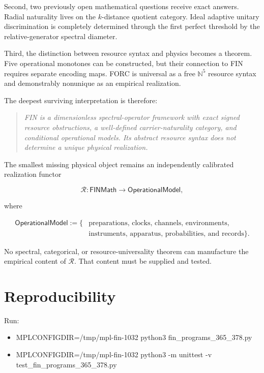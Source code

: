 \documentclass[11pt,a4paper,openany]{report}
\begin{document}
Second, two previously open mathematical questions receive exact answers. Radial naturality lives on the \(k\)-distance quotient category. Ideal adaptive unitary discrimination is completely determined through the first perfect threshold by the relative-generator spectral diameter.

Third, the distinction between resource syntax and physics becomes a theorem. Five operational monotones can be constructed, but their connection to FIN requires separate encoding maps. FORC is universal as a free \(\mathbb N^5\) resource syntax and demonstrably nonunique as an empirical realization.

The deepest surviving interpretation is therefore:

\begin{quote}\itshape
FIN is a dimensionless spectral-operator framework with exact signed resource obstructions, a well-defined carrier-naturality category, and conditional operational models. Its abstract resource syntax does not determine a unique physical realization.

\end{quote}

The smallest missing physical object remains an independently calibrated realization functor

\[
\mathcal R:
\mathsf{FINMath}
\longrightarrow
\mathsf{OperationalModel},
\]

where

\[
\begin{aligned}
\mathsf{OperationalModel}:=\{&
\text{preparations, clocks, channels, environments,}\\
&
\text{instruments, apparatus, probabilities, and records}
\}.
\end{aligned}
\]

No spectral, categorical, or resource-universality theorem can manufacture the empirical content of \(\mathcal R\). That content must be supplied and tested.

\chapter{Reproducibility}

Run:

\begin{itemize}
\item 
MPLCONFIGDIR=/\allowbreak{}tmp/\allowbreak{}mpl-fin-1032 python3 fin\_programs\_365\_378.py

\item 
MPLCONFIGDIR=/\allowbreak{}tmp/\allowbreak{}mpl-fin-1032 python3 -m unittest -v test\_fin\_programs\_365\_378.py

\end{itemize}
\end{document}
